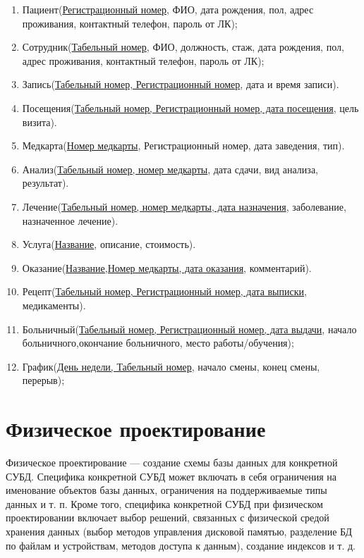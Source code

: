 \documentclass[14pt,a4paper,russian]{extreport}
\begin{document}
\begin{enumerate}
            \item Пациент(\underline{Регистрационный номер}, ФИО, дата рождения, пол, адрес
                проживания, контактный телефон, пароль от ЛК);
            \item Сотрудник(\underline{Табельный номер}, ФИО, должность, стаж, дата рождения, пол, адрес
                проживания, контактный телефон, пароль от ЛК);
            \item Запись(\underline{Табельный номер, Регистрационный номер}, дата и время записи).
            \item Посещения(\underline{Табельный номер, Регистрационный номер, дата посещения},
                цель визита).
            \item Медкарта(\underline{Номер медкарты}, Регистрационный номер, дата заведения, тип).
            \item Анализ(\underline{Табельный номер, номер медкарты}, дата сдачи, вид анализа,
                результат).
            \item Лечение(\underline{Табельный номер, номер медкарты, дата назначения},
                заболевание, назначенное лечение).
            \item Услуга(\underline{Название}, описание, стоимость).
            \item Оказание(\underline{Название,Номер медкарты, дата оказания}, комментарий).
            \item Рецепт(\underline{Табельный номер, Регистрационный номер, дата выписки}, медикаменты).
            \item Больничный(\underline{Табельный номер, Регистрационный номер, дата выдачи},
                начало больничного,окончание больничного, место работы/обучения);
            \item График(\underline{День недели, Табельный номер}, начало смены, конец смены,
                перерыв);
\end{enumerate}



\chapter{Физическое проектирование}
Физическое проектирование — создание схемы базы данных для конкретной СУБД. Специфика конкретной
СУБД может включать в себя ограничения на именование объектов базы данных, ограничения на
поддерживаемые типы данных и т. п. Кроме того, специфика конкретной СУБД при физическом
проектировании включает выбор решений, связанных с физической средой хранения данных (выбор методов
управления дисковой памятью, разделение БД по файлам и устройствам, методов доступа к данным),
создание индексов и т. д.\cite{dbdesign} 
\end{document}
